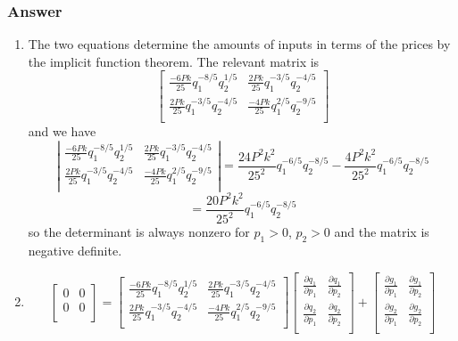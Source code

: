 \documentclass[12pt]{article}
\begin{document}
\subsubsection{Answer}
\begin{enumerate}
\item The two equations determine the amounts of inputs in terms of the prices by the implicit function theorem. The relevant matrix is
\[ \left[ \begin{array}{lr} \frac{-6 P k}{25} q_1^{-8/5} q_2^{1/5} & \frac{2 P k}{25} q_1^{-3/5}q_2^{-4/5}\\  \frac{2 P k}{25} q_1^{-3/5} q_2^{-4/5} & \frac{-4 P k}{25} q_1^{2/5}q_2^{-9/5}\\   \end{array} \right] \]
and we have
\[ \left| \begin{array}{lr} \frac{-6 P k}{25} q_1^{-8/5} q_2^{1/5} & \frac{2 P k}{25} q_1^{-3/5}q_2^{-4/5}\\  \frac{2 P k}{25} q_1^{-3/5} q_2^{-4/5} & \frac{-4 P k}{25} q_1^{2/5}q_2^{-9/5}\\   \end{array} \right| 
=\frac{24P^2 k^2}{25^2}q_1^{-6/5}q_2^{-8/5}-\frac{4P^2 k^2}{25^2}q_1^{-6/5}q_2^{-8/5} \]
\[=\frac{20P^2 k^2}{25^2}q_1^{-6/5}q_2^{-8/5}
\] 
so the determinant is always nonzero for $p_1>0$, $p_2>0$ and the matrix is negative definite.
\item
\[
\left[
\begin{array}{lr}
0&0 \\ 
0&0\\
\end{array}
\right] =
\left[ \begin{array}{lr} \frac{-6 P k}{25} q_1^{-8/5} q_2^{1/5} & \frac{2 P k}{25} q_1^{-3/5}q_2^{-4/5}\\  \frac{2 P k}{25} q_1^{-3/5} q_2^{-4/5} & \frac{-4 P k}{25} q_1^{2/5}q_2^{-9/5}\\   \end{array} \right] 
\left[
\begin{array}{lr}
\frac{\partial q_1}{\partial p_1} & \frac{\partial q_1}{\partial p_2} \\ 
\frac{\partial q_2}{\partial p_1} & \frac{\partial q_2}{\partial p_2} \\
\end{array}
\right]
+\left[
\begin{array}{lr}
\frac{\partial g_1}{\partial p_1} & \frac{\partial g_1}{\partial p_2} \\ 
\frac{\partial g_2}{\partial p_1} & \frac{\partial g_2}{\partial p_2} \\
\end{array}
\right]
\]


\end{enumerate}
\end{document}
